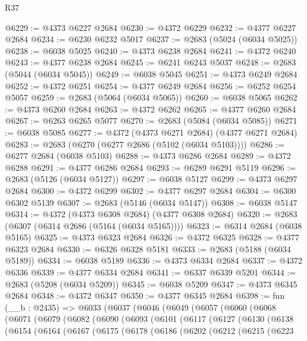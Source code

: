 \begin{lexlean}{R37}
\begin{coremodule}
@6229 := @4373 @6227 @2684
@6230 := @4372 @6229
@6232 := @4377 @6227 @2684
@6234 := @6230 @6232 @5017
@6237 := @2683 (@5024 (@6034 @5025))
@6238 := @6038 @5025
@6240 := @4373 @6238 @2684
@6241 := @4372 @6240
@6243 := @4377 @6238 @2684
@6245 := @6241 @6243 @5037
@6248 := @2683 (@5044 (@6034 @5045))
@6249 := @6038 @5045
@6251 := @4373 @6249 @2684
@6252 := @4372 @6251
@6254 := @4377 @6249 @2684
@6256 := @6252 @6254 @5057
@6259 := @2683 (@5064 (@6034 @5065))
@6260 := @6038 @5065
@6262 := @4373 @6260 @2684
@6263 := @4372 @6262
@6265 := @4377 @6260 @2684
@6267 := @6263 @6265 @5077
@6270 := @2683 (@5084 (@6034 @5085))
@6271 := @6038 @5085
@6277 := @4372 (@4373 @6271 @2684) (@4377 @6271 @2684)
@6283 := @2683 (@6270 (@6277 @2686 (@5102 (@6034 @5103))))
@6286 := @6277 @2684 (@6038 @5103)
@6288 := @4373 @6286 @2684
@6289 := @4372 @6288
@6291 := @4377 @6286 @2684
@6293 := @6289 @6291 @5119
@6296 := @2683 (@5126 (@6034 @5127))
@6297 := @6038 @5127
@6299 := @4373 @6297 @2684
@6300 := @4372 @6299
@6302 := @4377 @6297 @2684
@6304 := @6300 @6302 @5139
@6307 := @2683 (@5146 (@6034 @5147))
@6308 := @6038 @5147
@6314 := @4372 (@4373 @6308 @2684) (@4377 @6308 @2684)
@6320 := @2683 (@6307 (@6314 @2686 (@5164 (@6034 @5165))))
@6323 := @6314 @2684 (@6038 @5165)
@6325 := @4373 @6323 @2684
@6326 := @4372 @6325
@6328 := @4377 @6323 @2684
@6330 := @6326 @6328 @5181
@6333 := @2683 (@5188 (@6034 @5189))
@6334 := @6038 @5189
@6336 := @4373 @6334 @2684
@6337 := @4372 @6336
@6339 := @4377 @6334 @2684
@6341 := @6337 @6339 @5201
@6344 := @2683 (@5208 (@6034 @5209))
@6345 := @6038 @5209
@6347 := @4373 @6345 @2684
@6348 := @4372 @6347
@6350 := @4377 @6345 @2684
@6398 := fun (__b : @2435) =>
  @6033
    (@6037
      (@6046
        (@6049
          (@6057
            (@6060
              (@6068
                (@6071
                  (@6079
                    (@6082
                      (@6090
                        (@6093
                          (@6101
                            (@6117
                              (@6127
                                (@6130
                                  (@6138
                                    (@6154
                                      (@6164
                                        (@6167
                                          (@6175
                                            (@6178
                                              (@6186
                                                (@6202
                                                  (@6212
                                                    (@6215
                                                      (@6223

\end{coremodule}
\end{lexlean}
